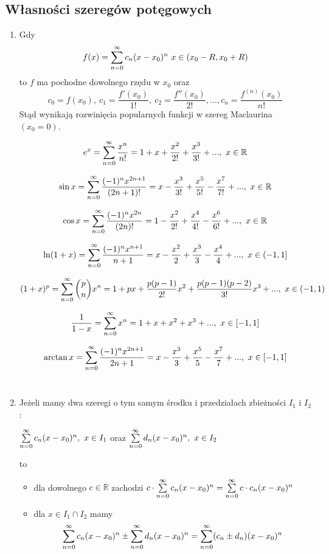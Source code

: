 \subsection{Własności szeregów potęgowych}

\begin{enumerate}
    \item Gdy
    $$ f(x) = \sum\limits_{n = 0}^{\infty} c_n(x - x_0)^n \ x \in (x_0 - R, x_0 + R) $$ to $f$ ma pochodne dowolnego rzędu w $x_0$
    oraz $$ c_0 = f(x_0), \ c_1 = \frac{f'(x_0)}{1!}, \ c_2 = \frac{f''(x_0)}{2!}, ... , c_n = \frac{f^{(n)}(x_0)}{n!} $$
    Stąd wynikają rozwinięcia popularnych funkcji w szereg Maclaurina $(x_0 = 0)$.

    $$ e^x = \sum\limits_{n = 0}^{\infty} \frac{x^n}{n!} = 1 + x + \frac{x^2}{2!} + \frac{x^3}{3!} + ... , \ x \in \mathbb{R} $$
    
    $$ \sin x = \sum\limits_{n = 0}^{\infty} \frac{(-1)^n x^{2n+1}}{(2n + 1)!} = x - \frac{x^3}{3!} + \frac{x^5}{5!} - \frac{x^7}{7!} + ... , \ x \in \mathbb{R} $$

    $$ \cos x = \sum\limits_{n = 0}^{\infty} \frac{(-1)^n x^{2n}}{(2n)!} = 1 - \frac{x^2}{2!} + \frac{x^4}{4!} - \frac{x^6}{6!} + ... , \ x \in \mathbb{R} $$
    
    $$ \ln (1+x) = \sum\limits_{n = 0}^{\infty} \frac{(-1)^n x^{n+1}}{n+1} = x - \frac{x^2}{2} + \frac{x^3}{3} - \frac{x^4}{4} + ... , \ x \in (-1, 1] $$
    
    $$ (1+x)^p = \sum\limits_{n = 0}^{\infty} \binom{p}{n} x^n = 1 + px + \frac{p(p-1)}{2!}x^2 + \frac{p(p-1)(p-2)}{3!}x^3 + ... , \ x \in (-1, 1)  $$

    $$ \frac{1}{1-x} = \sum\limits_{n = 0}^{\infty} x^n = 1 + x + x^2 + x^3 + ... , \ x \in [-1, 1] $$

    $$ \arctan x = \sum\limits_{n = 0}^{\infty} \frac{(-1)^n x^{2n+1}}{2n+1} = x - \frac{x^3}{3} + \frac{x^5}{5} - \frac{x^7}{7} + ... , \ x \in [-1, 1] $$ \\

    \item Jeżeli mamy dwa szeregi o tym samym środku i przedziałach zbieżności $I_1$ i $I_2$:
    
    $ \sum\limits_{n = 0}^{\infty} c_n(x - x_0)^n, \ x \in I_1 $ oraz $ \sum\limits_{n = 0}^{\infty} d_n(x - x_0)^n, \ x \in I_2 $

    to

    \begin{itemize}
        \item dla dowolnego $c \in \mathbb{R}$ zachodzi $ c \cdot \sum\limits_{n = 0}^{\infty} c_n(x - x_0)^n = 
        \sum\limits_{n = 0}^{\infty} c \cdot c_n(x - x_0)^n $
        \item dla $ x \in I_1 \cap I_2 $ mamy
        $$ \sum\limits_{n = 0}^{\infty} c_n(x - x_0)^n \pm \sum\limits_{n = 0}^{\infty} d_n(x - x_0)^n = 
        \sum\limits_{n = 0}^{\infty} (c_n \pm d_n)(x - x_0)^n $$ \\
    \end{itemize}


\end{enumerate}

